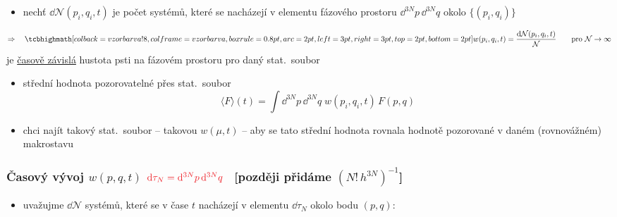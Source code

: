 \begin{definice}
\begin{itemize}
  \item[$\to$] nechť $\dd\mathcal N(p_i,q_i,t)$ je počet systémů, které se nacházejí v elementu fázového prostoru $\dd^{3N}p\,\dd^{3N}q$ okolo $\{(p_i,q_i)\}$
\end{itemize}
\[
  \Rightarrow\quad \vzorec{w(p_i,q_i,t) = \frac{\dd\mathcal N(p_i,q_i,t)}{\mathcal N}\qquad\text{pro } \mathcal N\to\infty}
\]
je \underline{časově závislá} hustota psti na fázovém prostoru pro daný stat.\ soubor
\end{definice}

\begin{itemize}
  \item střední hodnota pozorovatelné přes stat.\ soubor
  \[
    \langle F\rangle(t) = \int\dd^{3N}p\,\dd^{3N}q\;w(p_i,q_i,t)\,F(p,q)
  \]
  \item chci najít takový stat.\ soubor -- takovou $w(\mu,t)$ -- aby se tato střední hodnota rovnala hodnotě pozorované v daném (rovnovážném) makrostavu
\end{itemize}

\subsubsection*{Časový vývoj $w(p,q,t)$
  \hfill {\normalfont $\textcolor{Red}{\dd\tau_N = \dd^{3N}p\,\dd^{3N}q}$ \
  \textcolor{NavyBlue}{\small[později přidáme $(N!\,h^{3N})^{-1}$]}}}
\begin{itemize}
  \item uvažujme $\dd\mathcal N$ systémů, které se v čase $t$ nacházejí v elementu $\dd\tau_N$ okolo bodu $(p,q)$:
\end{itemize}

